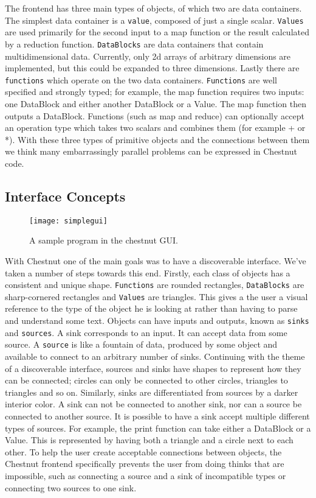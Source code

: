 \documentclass[twocolumn]{article}
\renewcommand{\|}{\origbar} %
\newcommand{\code}[1]{\texttt{#1}}
\begin{document}
The frontend has three main types of objects, of which two are data containers. The simplest data container is a \code{value}, composed of just a single scalar. \code{Values} are used primarily for the second input to a map function or the result calculated by a reduction function. \code{DataBlocks} are data containers that contain multidimensional data. Currently, only 2d arrays of arbitrary dimensions are implemented, but this could be expanded to three dimensions. Lastly there are \code{functions} which operate on the two data containers. \code{Functions} are well specified and strongly typed; for example, the map function requires two inputs: one DataBlock and either another DataBlock or a Value. The map function then outputs a DataBlock. Functions (such as map and reduce) can optionally accept an operation type which takes two scalars and combines them (for example + or *). With these three types of primitive objects and the connections between them we think many embarrassingly parallel problems can be expressed in Chestnut code.

\subsection{Interface Concepts}

\begin{figure}[h!]
  \centering
    \texttt{[image: simplegui]}
  \caption{A sample program in the chestnut GUI.}
\end{figure}

With Chestnut one of the main goals was to have a discoverable interface. We've taken a number of steps towards this end. Firstly, each class of objects has a consistent and unique shape. \code{Functions} are rounded rectangles, \code{DataBlocks} are sharp-cornered rectangles and \code{Values} are triangles. This gives a the user a visual reference to the type of the object he is looking at rather than having to parse and understand some text. Objects can have inputs and outputs, known as \code{sinks} and \code{sources}. A sink corresponds to an input. It can accept data from some source. A \code{source} is like a fountain of data, produced by some object and available to connect to an arbitrary number of sinks. Continuing with the theme of a discoverable interface, sources and sinks have shapes to represent how they can be connected; circles can only be connected to other circles, triangles to triangles and so on. Similarly, sinks are differentiated from sources by a darker interior color. A sink can not be connected to another sink, nor can a source be connected to another source. It is possible to have a sink accept multiple different types of sources. For example, the print function can take either a DataBlock or a Value. This is represented by having both a triangle and a circle next to each other. To help the user create acceptable connections between objects, the Chestnut frontend specifically prevents the user from doing thinks that are impossible, such as connecting a source and a sink of incompatible types or connecting two sources to one sink.
\end{document}
